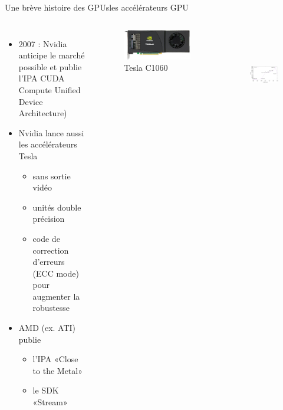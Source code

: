 \documentclass[11pt,mathserif]{beamer}
\newcommand{\harritu}{\faExclamation}
\begin{document}
\begin{frame}{Une brève histoire des GPUs}{les accélérateurs GPU}
  \begin{columns}[t]
    \column{6cm}
    \begin{itemize}[<+->]
      \item 2007 : Nvidia anticipe le marché possible et publie l'IPA CUDA
         Compute Unified Device Architecture)
      \item Nvidia lance aussi les accélérateurs Tesla
        \begin{itemize}
          \item sans sortie vidéo \harritu
          \item unités double précision
          \item code de correction d'erreurs (ECC mode) pour augmenter la robustesse
         \end{itemize}
       \item AMD (ex. ATI) publie
        \begin{itemize}
          \item l'IPA «Close to the Metal»
          \item le SDK «Stream»
        \end{itemize}
    \end{itemize} 
    \column{5cm}
\pause
\begin{figure}[htbp]
  \includegraphics[width=0.7\linewidth]{fig/C1060.jpg}
      \caption{\tiny Tesla C1060}
 \end{figure}
\begin{figure}[htbp]
  \includegraphics[height=4cm, width=0.9\linewidth]{fig/nb_coeurs_gpu.eps}
 \end{figure}
  \end{columns}
\end{frame}
\end{document}
